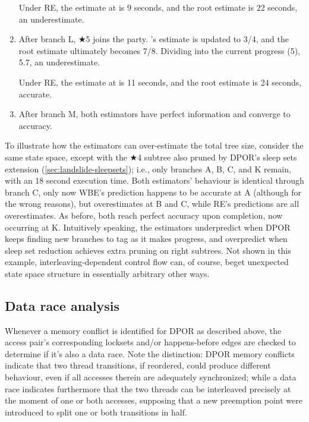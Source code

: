 \begin{enumerate}
		Under RE, the estimate at  is 9 seconds,
		and the root estimate is 22 seconds, an underestimate.
	\item After branch L, $\bigstar$5 joins the party.
		's estimate is updated to 3/4,
		and the root estimate ultimately becomes 7/8.
		Dividing into the current progress (5), 5.7, an underestimate.

		Under RE, the estimate at  is 11 seconds,
		and the root estimate is 24 seconds, accurate.
	\item After branch M, both estimators have perfect information and converge to accuracy.
\end{enumerate}

To illustrate how the estimators can over-estimate the total tree size,
consider the same state space,
except with the $\bigstar$4 subtree also pruned by DPOR's sleep sets extension (\cref{sec:landslide-sleepsets});
i.e., only branches A, B, C, and K remain,
with an 18 second execution time.
Both estimators' behaviour is identical through branch C,
only now WBE's prediction happens to be accurate at A (although for the wrong reasons),
but overestimates at B and C,
while RE's predictions are all overestimates.
As before, both reach perfect accuracy upon completion, now occurring at K.
Intuitively speaking, the estimators underpredict when DPOR keeps finding new branches to tag as it makes progress,
and overpredict when sleep set reduction achieves extra pruning on right subtrees.
Not shown in this example, interleaving-dependent control flow can, of course,
beget unexpected state space structure in essentially arbitrary other ways.


\subsection{Data race analysis}
\label{sec:landslide-datarace}

Whenever a memory conflict is identified for DPOR as described above,
the access pair's corresponding locksets and/or happens-before edges are checked to determine if it's also a data race.
Note the distinction: DPOR memory conflicts indicate that two thread transitions,
if reordered, could produce different behaviour, even if all accesses therein are adequately synchronized;
while a data race indicates furthermore that the two threads can be interleaved precisely at the moment of one or both accesses,
supposing that a new preemption point were introduced to split one or both transitions in half.

